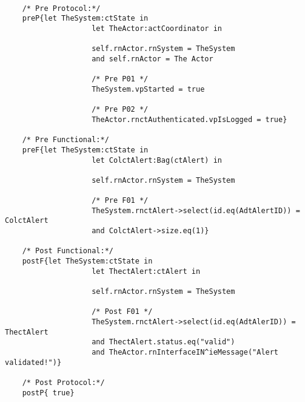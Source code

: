 	\scriptsize
	\vspace{0.5cm}
	\begin{lstlisting}[style=MessirStyle,firstnumber=auto,captionpos=b,caption={\msrmessir (MCL-oriented) specification of the operation \emph{oeValidateAlert}.},label=OM-actCoordinator-oeValidateAlert-MCL-LST]

	/* Pre Protocol:*/ 
	preP{let TheSystem:ctState in
					let TheActor:actCoordinator in
					
					self.rnActor.rnSystem = TheSystem
					and self.rnActor = The Actor
					
					/* Pre P01 */
					TheSystem.vpStarted = true
					
					/* Pre P02 */
					TheActor.rnctAuthenticated.vpIsLogged = true}
	
	/* Pre Functional:*/
	preF{let TheSystem:ctState in
					let ColctAlert:Bag(ctAlert) in
				
					self.rnActor.rnSystem = TheSystem
				
					/* Pre F01 */
					TheSystem.rnctAlert->select(id.eq(AdtAlertID)) = ColctAlert
					and ColctAlert->size.eq(1)}
	
	/* Post Functional:*/ 
	postF{let TheSystem:ctState in
					let ThectAlert:ctAlert in
				
					self.rnActor.rnSystem = TheSystem
				
					/* Post F01 */
					TheSystem.rnctAlert->select(id.eq(AdtAlerID)) = ThectAlert
					and ThectAlert.status.eq("valid")
					and TheActor.rnInterfaceIN^ieMessage("Alert validated!")}
	
	/* Post Protocol:*/ 
	postP{ true}
	
	\end{lstlisting}
	\normalsize 
	
	
	
	





